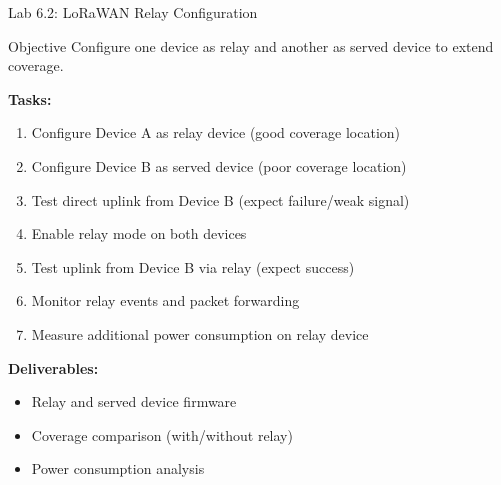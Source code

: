 \documentclass{beamer}
\begin{document}
\begin{frame}{Lab 6.2: LoRaWAN Relay Configuration}
\begin{block}{Objective}
Configure one device as relay and another as served device to extend coverage.
\end{block}

\textbf{Tasks:}
\begin{enumerate}
    \item Configure Device A as relay device (good coverage location)
    \item Configure Device B as served device (poor coverage location)
    \item Test direct uplink from Device B (expect failure/weak signal)
    \item Enable relay mode on both devices
    \item Test uplink from Device B via relay (expect success)
    \item Monitor relay events and packet forwarding
    \item Measure additional power consumption on relay device
\end{enumerate}

\vspace{0.3cm}

\textbf{Deliverables:}
\begin{itemize}
    \item Relay and served device firmware
    \item Coverage comparison (with/without relay)
    \item Power consumption analysis
\end{itemize}
\end{frame}
\end{document}
